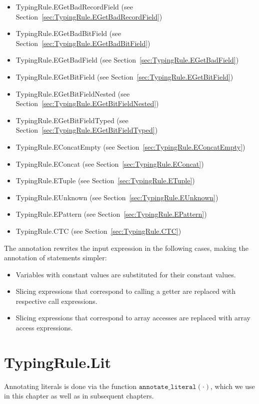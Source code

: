 \documentclass{book}
\newcommand\annotateliteral[1]{\texttt{annotate\_literal}(#1)}
\begin{document}
\begin{itemize}
\item TypingRule.EGetBadRecordField (see Section~\ref{sec:TypingRule.EGetBadRecordField})
\item TypingRule.EGetBadBitField (see Section~\ref{sec:TypingRule.EGetBadBitField})
\item TypingRule.EGetBadField (see Section~\ref{sec:TypingRule.EGetBadField})
\item TypingRule.EGetBitField (see Section~\ref{sec:TypingRule.EGetBitField})
\item TypingRule.EGetBitFieldNested (see Section~\ref{sec:TypingRule.EGetBitFieldNested})
\item TypingRule.EGetBitFieldTyped (see Section~\ref{sec:TypingRule.EGetBitFieldTyped})
\item TypingRule.EConcatEmpty (see Section~\ref{sec:TypingRule.EConcatEmpty})
\item TypingRule.EConcat (see Section~\ref{sec:TypingRule.EConcat})
\item TypingRule.ETuple (see Section~\ref{sec:TypingRule.ETuple})
\item TypingRule.EUnknown (see Section~\ref{sec:TypingRule.EUnknown})
\item TypingRule.EPattern (see Section~\ref{sec:TypingRule.EPattern})
\item TypingRule.CTC (see Section~\ref{sec:TypingRule.CTC})
\end{itemize}

The annotation rewrites the input expression in the following cases, making the annotation of statements simpler:
\begin{itemize}
  \item Variables with constant values are substituted for their constant values.
  \item Slicing expressions that correspond to calling a getter are replaced with respective call expressions.
  \item Slicing expressions that correspond to array accesses are replaced with array access expressions.
\end{itemize}


\section{TypingRule.Lit \label{sec:TypingRule.Lit}}

Annotating literals is done via the function $\annotateliteral{\cdot}$,
which we use in this chapter as well as in subsequent chapters.
\end{document}
